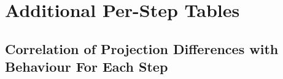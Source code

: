 \chapter{Additional Per-Step Tables}

\section{Correlation of Projection Differences with Behaviour For Each Step}

\begin{table}[htbp]
    \centering
    \scriptsize
    \setlength{\tabcolsep}{3pt}
    
    \caption{Correlation $r$ between each projection difference and the behaviour reached after the step, at every checkpoint of every trunk for each of the projection difference variants discussed in .}
    \label{tab:decay-correlations}
\end{table}

%     


%     


